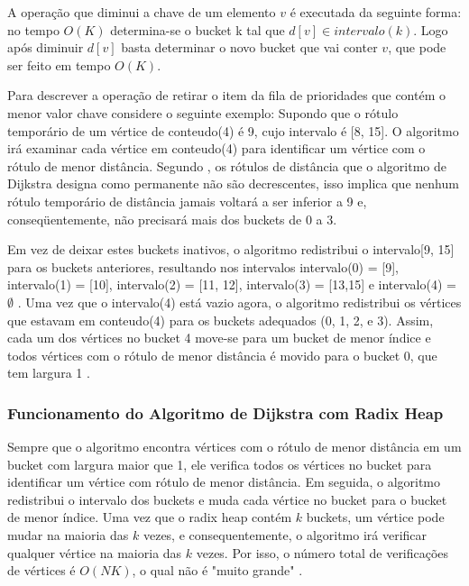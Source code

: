 A operação que diminui a chave de um elemento $v$ é executada da seguinte forma: no tempo $O(K)$ determina-se
o bucket k tal que $d[v] \in intervalo(k)$. Logo após diminuir $d[v]$ basta determinar o novo bucket que vai conter
$v$, que pode ser feito em tempo $O(K)$.

Para descrever a operação de retirar o item da fila de prioridades que contém o menor valor chave considere o seguinte exemplo:
Supondo que o rótulo temporário de um vértice de conteudo(4) é 9, cujo intervalo é [8, 15].
O algoritmo irá examinar cada vértice em conteudo(4) para identificar um vértice com o rótulo de menor distância.
Segundo \cite{bookahuja}, os rótulos de distância que o algoritmo de Dijkstra designa como permanente não são decrescentes,
isso implica que nenhum rótulo temporário de distância jamais voltará
a ser inferior a 9 e, conseqüentemente, não precisará mais dos buckets de 0 a 3.

Em vez de deixar estes buckets inativos, o algoritmo redistribui o intervalo[9, 15]
para os buckets anteriores, resultando nos intervalos intervalo(0) = [9], intervalo(1) = [10],
intervalo(2) = [11, 12], intervalo(3) = [13,15] e intervalo(4) = $\emptyset$ . Uma vez que o intervalo(4)
está vazio agora, o algoritmo redistribui os vértices que estavam em conteudo(4) para os buckets adequados (0, 1, 2, e 3).
Assim, cada um dos vértices no bucket 4 move-se para um bucket de menor índice e todos vértices com o rótulo de menor distância
é movido para o bucket 0, que tem largura 1 \cite{bookahuja}.

\subsubsection{Funcionamento do Algoritmo de Dijkstra com Radix Heap}
Sempre que o algoritmo encontra vértices com o rótulo de menor distância em um bucket com
largura maior que 1, ele verifica todos os vértices no bucket para identificar um vértice com rótulo de menor distância.
Em seguida, o algoritmo redistribui o intervalo dos buckets e muda cada vértice no bucket para o bucket de menor índice.
Uma vez que o radix heap contém $k$ buckets, um vértice pode mudar na maioria das $k$ vezes, e consequentemente,
o algoritmo irá verificar qualquer vértice na maioria das $k$ vezes. Por isso, o número total de verificações
de vértices é $O(NK)$, o qual não é "muito grande" \cite{bookahuja}.

